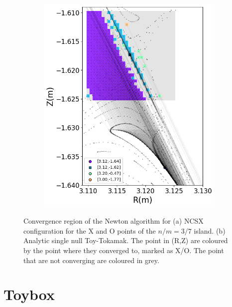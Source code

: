 \begin{figure}
\begin{subfigure}[c]{0.58\textwidth}
        \includegraphics[width=\textwidth]{images/fp/fige-10.png}
        \caption{\label{fig:fp-toybox}}
    \end{subfigure}
    \caption{Convergence region of the Newton algorithm for (a) NCSX configuration for the X and O points of the $n/m = 3/7$ island. (b) Analytic single null Toy-Tokamak. The point in (R,Z) are coloured by the point where they converged to, marked as X/O. The point that are not converging are coloured in grey.}
    \label{fig:fp-search}
\end{figure}


\chapter{Toybox}\label{ch:toybox}

